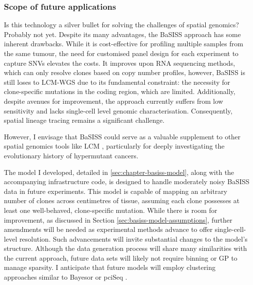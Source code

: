 \subsubsection*{Scope of future applications}

Is this technology a silver bullet for solving the challenges of spatial genomics? Probably not yet. Despite its many advantages, the \ac{BaSISS} approach has some inherent drawbacks. While it is cost-effective for profiling multiple samples from the same tumour, the need for customised panel design for each experiment to capture \acp{SNV} elevates the costs. It improves upon RNA sequencing methods, which can only resolve clones based on copy number profiles, however, \ac{BaSISS} is still loses to \ac{LCM}-\ac{WGS} due to its fundamental constraint: the necessity for clone-specific mutations in the coding region, which are limited. Additionally, despite avenues for improvement, the approach currently suffers from low sensitivity and lacks single-cell level genomic characterisation. Consequently, spatial lineage tracing remains a significant challenge.


However, I envisage that \ac{BaSISS} could serve as a valuable supplement to other spatial genomics tools like \ac{LCM} , particularly for deeply investigating the evolutionary history of hypermutant cancers.

The model I developed, detailed in \cref{sec:chapter-basiss-model}, along with the accompanying infrastructure code, is designed to handle moderately noisy \ac{BaSISS} data in future experiments. This model is capable of mapping an arbitrary number of clones across centimetres of tissue, assuming each clone possesses at least one well-behaved, clone-specific mutation. While there is room for improvement, as discussed in Section \cref{sec:basiss-model-assumptions}, further amendments will be needed as experimental methods advance to offer single-cell-level resolution. Such advancements will invite substantial changes to the model's structure. Although the data generation process will share many similarities with the current approach, future data sets will likely not require binning or \ac{GP} to manage sparsity. I anticipate that future models will employ clustering approaches similar to Bayesor \parencite{Petukhov2022-pv} or pciSeq \parencite{Qian2020-mp}.

